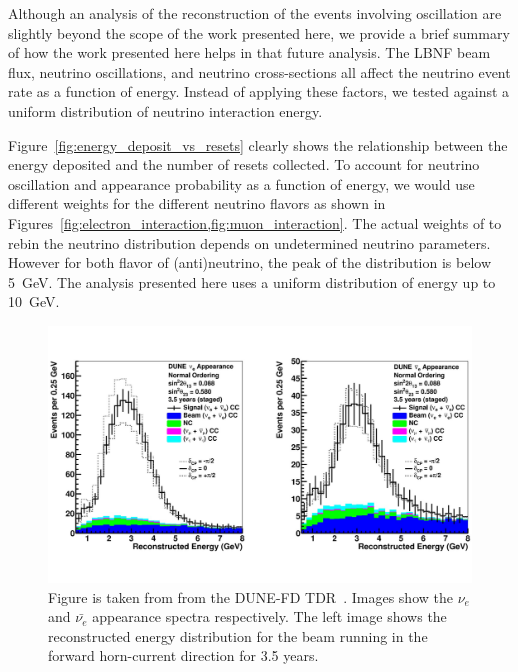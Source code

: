 Although an analysis of the reconstruction of the events involving oscillation are slightly beyond the scope of the work presented here, we provide a brief summary of how the work presented here helps in that future analysis.
The LBNF beam flux, neutrino oscillations, and neutrino cross-sections all affect the neutrino event rate as a function of energy.
Instead of applying these factors, we tested against a uniform distribution of neutrino interaction energy.

Figure~\ref{fig:energy_deposit_vs_resets} clearly shows the relationship between the energy deposited and the number of resets collected.
To account for neutrino oscillation and appearance probability as a function of energy, we would use different weights for the different neutrino flavors as shown in Figures~\cref{fig:electron_interaction,fig:muon_interaction}.
The actual weights of to rebin the neutrino distribution depends on undetermined neutrino parameters.
However for both flavor of (anti)neutrino, the peak of the distribution is below 5~\unit{GeV}.
The analysis presented here uses a uniform distribution of energy up to 10~\unit{GeV}.

\begin{figure}[]
\centering
\includegraphics[width=\textwidth]{images/tdr_electron_reconstruction_tdrv2.pdf}
\caption{Figure is taken from from the DUNE-FD TDR~\citep{DUNE_FD_TDRv2_2020}.
Images show the $\nu_{e}$ and $\bar{\nu_{e}}$ appearance spectra respectively.
The left image shows the reconstructed energy distribution for the beam running in the forward horn-current direction for 3.5 years.
}
\end{figure}~\label{fig:electron_interaction}

